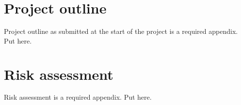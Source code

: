 \printbibliography[title={References},heading=bibintoc] %



\begin{uomappendix} 
    \section{Project outline}
    Project outline as submitted at the start of the project is a required appendix. Put here. 
    
    \section{Risk assessment}
    Risk assessment is a required appendix. Put here.

\end{uomappendix}


